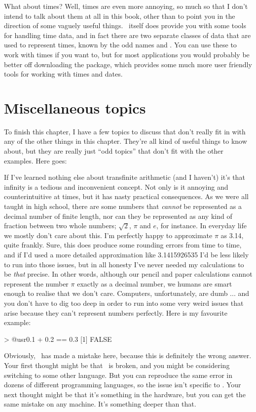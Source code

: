 What about times? Well, times are even more annoying, so much so that I don't intend to talk about them at all in this book, other than to point you in the direction of some vaguely useful things. \R\ itself does provide you with some tools for handling time data, and in fact there are two separate classes of data that are used to represent times, known by the odd names  and . You can use these to work with times if you want to, but for most applications you would probably be better off downloading the  package, which provides some much more user friendly tools for working with times and dates. 





\section{Miscellaneous topics~\label{sec:miscdatahandling}}

To finish this chapter, I have a few topics to discuss that don't really fit in with any of the other things in this chapter. They're all kind of useful things to know about, but they are really just ``odd topics'' that don't fit with the other examples. Here goes:


If I've learned nothing else about transfinite arithmetic (and I haven't) it's that infinity is a tedious and inconvenient concept. Not only is it annoying and counterintuitive at times, but it has nasty practical consequences. As we were all taught in high school, there are some numbers that {\it cannot} be represented as a decimal number of finite length, nor can they be represented as any kind of fraction between two whole numbers; $\sqrt{2}$, $\pi$ and $e$, for instance. In everyday life we mostly don't care about this. I'm perfectly happy to approximate $\pi$ as 3.14, quite frankly. Sure, this does produce some rounding errors from time to time, and if I'd used a more detailed approximation like 3.1415926535 I'd be less likely to run into those issues, but in all honesty I've never needed my calculations to be {\it that} precise. In other words, although our pencil and paper calculations cannot represent the number $\pi$ exactly as a decimal number, we humans are smart enough to realise that we don't care. Computers, unfortunately, are dumb ... and you don't have to dig too deep in order to run into some very weird issues that arise because they can't represent numbers perfectly. Here is my favourite example: 
\begin{rblock1}
> @usr{0.1 + 0.2 == 0.3}
[1] FALSE
\end{rblock1}
Obviously, \R\ has made a mistake here, because this is definitely the wrong answer. Your first thought might be that \R\ is broken, and you might be considering switching to some other language. But you can reproduce the same error in dozens of different programming languages, so the issue isn't specific to \R. Your next thought might be that it's something in the hardware, but you can get the same mistake on any machine. It's something deeper than that. 


